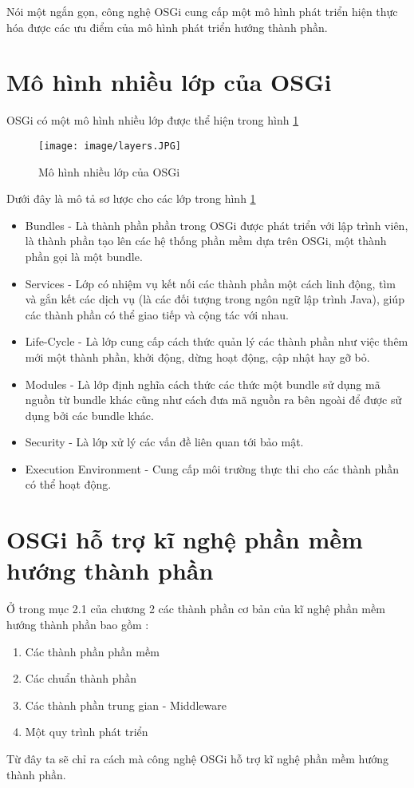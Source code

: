 Nói một ngắn gọn, công nghệ OSGi cung cấp một mô hình phát triển hiện thực hóa được các ưu điểm của mô hình phát triển hướng thành phần.

\section{Mô hình nhiều lớp của OSGi}

OSGi có một mô hình nhiều lớp \cite[p.~215]{whatisosgi} được thể hiện trong hình \ref{fig:layers}
\begin{figure}[htbp]
	\centering
		\texttt{[image: image/layers.JPG]}
	\caption{Mô hình nhiều lớp của OSGi}
	\label{fig:layers}
\end{figure}


Dưới đây là mô tả sơ lược cho các lớp trong hình \ref{fig:layers}
\begin{itemize}
	\item Bundles - Là thành phần phần trong OSGi được phát triển với lập trình viên, là thành phần tạo lên các hệ thống phần mềm dựa trên OSGi, một thành phần gọi là một bundle.
	\item Services - Lớp có nhiệm vụ kết nối các thành phần một cách linh động, tìm và gắn kết các dịch vụ (là các đối tượng trong ngôn ngữ lập trình Java),  giúp các thành phần có thể giao tiếp và cộng tác với nhau.
	\item Life-Cycle - Là lớp cung cấp cách thức quản lý các thành phần như việc thêm mới một thành phần, khởi động, dừng hoạt động, cập nhật hay gỡ bỏ.
	\item Modules - Là lớp định nghĩa cách thức các thức một bundle sử dụng mã nguồn từ bundle khác cũng như cách đưa mã nguồn ra bên ngoài để được sử dụng bởi các bundle khác. 	
	\item  Security - Là lớp xử lý các vấn đề liên quan tới bảo mật.
	\item  Execution Environment - Cung cấp môi trường thực thi cho các thành phần có thể hoạt động.
\end{itemize}

\section{OSGi hỗ trợ kĩ nghệ phần mềm hướng thành phần}
Ở trong mục 2.1 của chương 2 các thành phần cơ bản của kĩ nghệ phần mềm hướng thành phần bao gồm :
\begin{enumerate}
	\item Các thành phần phần mềm
	\item Các chuẩn thành phần
	\item Các thành phần trung gian - Middleware
	\item Một quy trình phát triển
\end{enumerate}
Từ đây ta sẽ chỉ ra cách mà công nghệ OSGi hỗ trợ kĩ nghệ phần mềm hướng thành phần.
